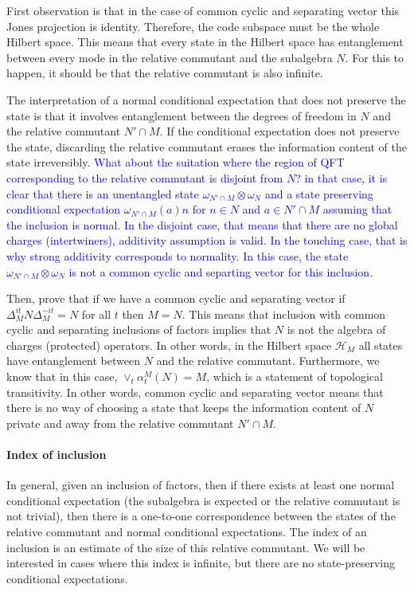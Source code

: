 \documentclass[a4paper,11pt]{article}
\theoremstyle{definition}
\newcommand{\NL}[1]{\textcolor{blue}{#1}}
\begin{document}
First observation is that in the case of common cyclic and separating vector this Jones projection is identity. Therefore, the code subspace must be the whole Hilbert space. This means that every state in the Hilbert space has entanglement between every mode in the relative commutant and the subalgebra $N$. For this to happen, it should be that the relative commutant is also infinite.

The interpretation of a normal conditional expectation that does not preserve the state is that it involves entanglement between the degrees of freedom in $N$ and the relative commutant $N'\cap M$. If the conditional expectation does not preserve the state, discarding the relative commutant erases the information content of the state irreversibly. \NL{What about the suitation where the region of QFT corresponding to the relative commutant is disjoint from $N$? in that case, it is clear that there is an unentangled state $\omega_{N'\cap M}\otimes \omega_N$ and a state preserving conditional expectation $\omega_{N'\cap M}(a)n$ for $n\in N$ and $a\in N'\cap M$ assuming that the inclusion is normal. In the disjoint case, that means that there are no global charges (intertwiners), additivity assumption is valid. In the touching case, that is why strong additivity corresponds to normality. In this case, the state $\omega_{N'\cap M}\otimes \omega_N$ is not a common cyclic and separting vector for this inclusion.} 

Then, prove that if we have a common cyclic and separating vector if $\Delta_M^{it}N\Delta_M^{-it}=N$ for all $t$ then $M=N$. This means that inclusion with common cyclic and separating inclusions of factors implies that $N$ is not the algebra of charges (protected) operators. In other words, in the Hilbert space $\mathcal{H}_M$ all states have entanglement between $N$ and the relative commutant. Furthermore, we know that in this case, $\vee_t \alpha_t^M(N)=M$, which is a statement of topological transitivity. In other words, common cyclic and separating vector means that there is no way of choosing a state that keeps the information content of $N$ private and away from the relative commutant $N'\cap M$.



\paragraph{Index of inclusion}

In general, given an inclusion of factors, then if there exists at least one normal conditional expectation (the subalgebra is expected or the relative commutant is not trivial), then there is a one-to-one correspondence between the states of the relative commutant and normal conditional expectations. The index of an inclusion is an estimate of the size of this relative commutant. We will be interested in cases where this index is infinite, but there are no state-preserving conditional expectations. 
\end{document}
